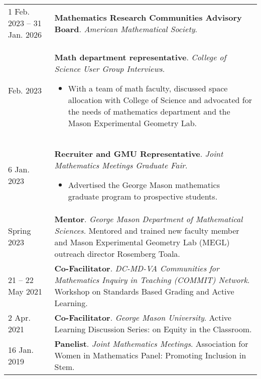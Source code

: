    \begin{center}
    {
    \renewcommand{\arraystretch}{1.2}
    \begin{longtable}{p{}  p{}}
    1 Feb.  2023 -- 31 Jan.  2026 & \textbf{Mathematics Research Communities Advisory Board}. \textit{American Mathematical Society}.  \\ 
 Feb.  2023 & \textbf{Math department representative}. \textit{College of Science User Group Interviews}. 
        \hspace{-1em}

        {\small
        \begin{itemize}
        \setlength{\parindent}{0em}
        \item[] With a team of math faculty, discussed space allocation with College of Science and advocated for the needs of mathematics department and the Mason Experimental Geometry Lab.
        \end{itemize}
        }
        \vspace{-1em}
         \\ 
6 Jan.  2023 & \textbf{Recruiter and GMU Representative}. \textit{Joint Mathematics Meetings Graduate Fair}. 
        \hspace{-1em}

        {\small
        \begin{itemize}
        \setlength{\parindent}{0em}
        \item[] Advertised the George Mason mathematics graduate program to prospective students.
        \end{itemize}
        }
        \vspace{-1em}
         \\ 
  Spring 2023 & \textbf{Mentor}. \textit{George Mason Department of Mathematical Sciences}.  Mentored and trained new faculty member and Mason Experimental Geometry Lab (MEGL) outreach director Rosemberg Toala.  \\ 
21  -- 22 May  2021 & \textbf{Co-Facilitator}. \textit{DC-MD-VA Communities for Mathematics Inquiry in Teaching (COMMIT) Network}.  Workshop on Standards Based Grading and Active Learning.  \\ 
2 Apr.  2021 & \textbf{Co-Facilitator}. \textit{George Mason University}.  Active Learning Discussion Series: on Equity in the Classroom.  \\ 
16 Jan.  2019 & \textbf{Panelist}. \textit{Joint Mathematics Meetings}.  Association for Women in Mathematics Panel: Promoting Inclusion in Stem.  
    \end{longtable}
    } 
    \end{center}

